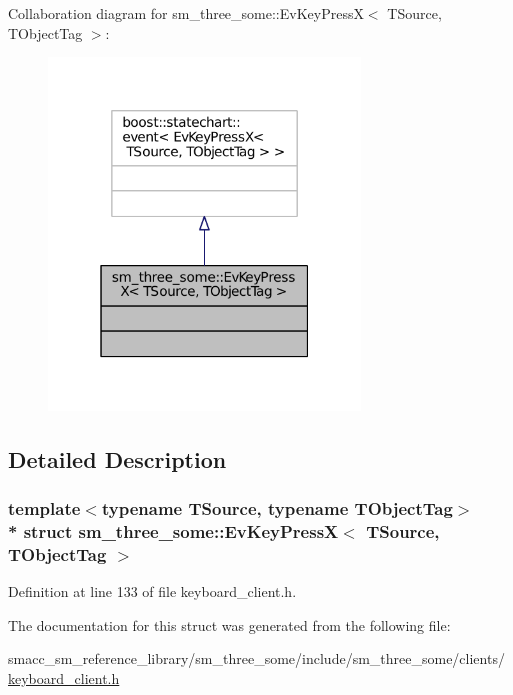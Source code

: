 Collaboration diagram for sm\+\_\+three\+\_\+some\+:\+:Ev\+Key\+PressX$<$ T\+Source, T\+Object\+Tag $>$\+:
\nopagebreak
\begin{figure}[H]
\begin{center}
\leavevmode
\includegraphics[width=235pt]{structsm__three__some_1_1EvKeyPressX__coll__graph}
\end{center}
\end{figure}


\subsection{Detailed Description}
\subsubsection*{template$<$typename T\+Source, typename T\+Object\+Tag$>$\\*
struct sm\+\_\+three\+\_\+some\+::\+Ev\+Key\+Press\+X$<$ T\+Source, T\+Object\+Tag $>$}



Definition at line 133 of file keyboard\+\_\+client.\+h.



The documentation for this struct was generated from the following file\+:\begin{DoxyCompactItemize}
\item 
smacc\+\_\+sm\+\_\+reference\+\_\+library/sm\+\_\+three\+\_\+some/include/sm\+\_\+three\+\_\+some/clients/\hyperlink{keyboard__client_8h}{keyboard\+\_\+client.\+h}\end{DoxyCompactItemize}
